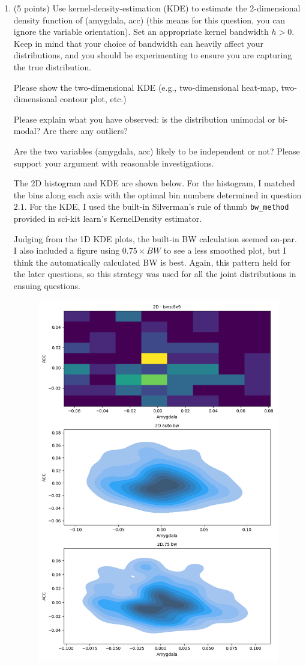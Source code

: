 \documentclass[twoside,12pt]{article}
\begin{document}
\begin{enumerate}[label*=\arabic*.]
 \item (5 points) Use kernel-density-estimation (KDE) to estimate the 2-dimensional density function of (\textsf{amygdala}, \textsf{acc}) (this means for this question, you can ignore the variable \textsf{orientation}). Set an appropriate kernel bandwidth $h>0$. Keep in mind that your choice of bandwidth can heavily affect your distributions, and you should be experimenting to ensure you are capturing the true distribution.
 

Please show the two-dimensional KDE (e.g., two-dimensional heat-map, two-dimensional contour plot, etc.)

Please explain what you have observed: is the distribution unimodal or bi-modal? Are there any outliers? 

Are the two variables (\textsf{amygdala}, \textsf{acc}) likely to be independent or not? Please support your argument with reasonable investigations.

The 2D histogram and KDE are shown below. For the histogram, I matched the bins along each axis with the optimal bin numbers determined in question $2.1$. For the KDE, I used the built-in Silverman's rule of thumb \lstinline{bw_method} provided in sci-kit learn's KernelDensity estimator.

    Judging from the 1D KDE plots, the built-in BW calculation seemed on-par. I also included a figure using $0.75 \times BW$ to see a less smoothed plot, but I think the automatically calculated BW is best. Again, this pattern held for the later questions, so this strategy was used for all the joint distributions in ensuing questions.

    \begin{figure}[H]
        \centering
        \includegraphics[width=\textwidth, height=\textwidth]{images/2D_2D.png}
    \end{figure}


\end{enumerate}
\end{document}
